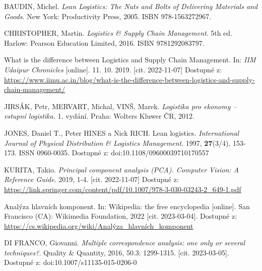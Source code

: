 



\begin{thebibliography}{1}

BAUDIN, Michel. \textit{Lean Logistics: The Nuts and Bolts of Delivering Materials and Goods}. New York: Productivity Press, 2005. ISBN 978-1563272967.

CHRISTOPHER, Martin. \textit{Logistics \& Supply Chain Management}. 5th ed. Harlow: Pearson Education Limited, 2016. ISBN 9781292083797.

What is the difference between Logistics and Supply Chain Management. In: \textit{IIM Udaipur Chronicles} [online]. 11. 10. 2019. [cit. 2022-11-07] Dostupné z: \url{https://www.iimu.ac.in/blog/what-is-the-difference-between-logistics-and-supply-chain-management/}

JIRSÁK, Petr, MERVART, Michal, VINŠ, Marek. \textit{Logistika pro ekonomy -- vstupní logistika.} 1. vydání. Praha: Wolters Kluwer ČR, 2012.

JONES, Daniel T., Peter HINES a Nick RICH. Lean logistics. \textit{International Journal of Physical Distribution \& Logistics Management}. 1997, \textbf{27}(3/4), 153-173. ISSN 0960-0035. Dostupné z: doi:10.1108/09600039710170557

KURITA, Takio. \textit{Principal component analysis (PCA). Computer Vision: A Reference Guide}. 2019, 1-4. [cit. 2022-11-07] Dostupné z: \url{https://link.springer.com/content/pdf/10.1007/978-3-030-03243-2\_649-1.pdf}

Analýza hlavních komponent. In: Wikipedia: the free encyclopedia [online]. San Francisco (CA): Wikimedia Foundation, 2022 [cit. 2023-03-04]. Dostupné z: \url{https://cs.wikipedia.org/wiki/Analýza\_hlavních\_komponent}

DI FRANCO, Giovanni. \textit{Multiple correspondence analysis: one only or several techniques?}. Quality \& Quantity, 2016, 50.3: 1299-1315. [cit. 2023-03-05]. Dostupné z: doi:10.1007/s11135-015-0206-0


\end{thebibliography}
